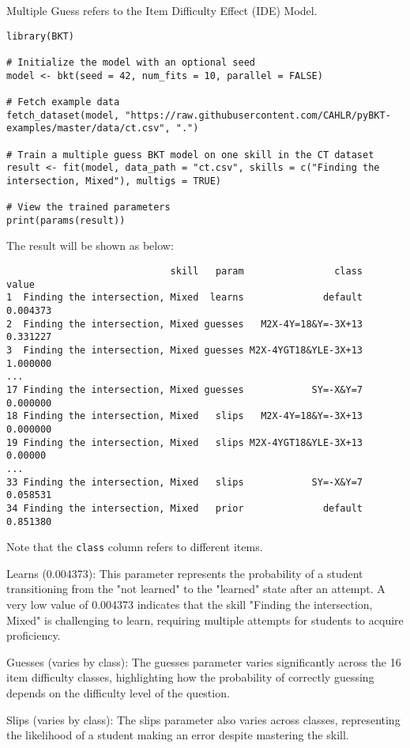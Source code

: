 \documentclass{article}
\begin{document}
Multiple Guess refers to the Item Difficulty Effect (IDE) Model.

\begin{lstlisting}[caption={R code to train an ILE BKT model}]
library(BKT)

# Initialize the model with an optional seed
model <- bkt(seed = 42, num_fits = 10, parallel = FALSE)

# Fetch example data
fetch_dataset(model, "https://raw.githubusercontent.com/CAHLR/pyBKT-examples/master/data/ct.csv", ".")

# Train a multiple guess BKT model on one skill in the CT dataset
result <- fit(model, data_path = "ct.csv", skills = c("Finding the intersection, Mixed"), multigs = TRUE)

# View the trained parameters
print(params(result))
\end{lstlisting}

The result will be shown as below:

\begin{verbatim}
                             skill   param                class    value
1  Finding the intersection, Mixed  learns              default 0.004373
2  Finding the intersection, Mixed guesses   M2X-4Y=18&Y=-3X+13 0.331227
3  Finding the intersection, Mixed guesses M2X-4YGT18&YLE-3X+13 1.000000
...
17 Finding the intersection, Mixed guesses            SY=-X&Y=7 0.000000
18 Finding the intersection, Mixed   slips   M2X-4Y=18&Y=-3X+13 0.000000
19 Finding the intersection, Mixed   slips M2X-4YGT18&YLE-3X+13 0.00000
...
33 Finding the intersection, Mixed   slips            SY=-X&Y=7 0.058531
34 Finding the intersection, Mixed   prior              default 0.851380
\end{verbatim}
    
Note that the \texttt{class} column refers to different items.

Learns (0.004373): This parameter represents the probability of a student transitioning from the "not learned" to the "learned" state after an attempt. A very low value of 0.004373 indicates that the skill "Finding the intersection, Mixed" is challenging to learn, requiring multiple attempts for students to acquire proficiency.

Guesses (varies by class): The guesses parameter varies significantly across the 16 item difficulty classes, highlighting how the probability of correctly guessing depends on the difficulty level of the question.

Slips (varies by class): The slips parameter also varies across classes, representing the likelihood of a student making an error despite mastering the skill.
\end{document}
